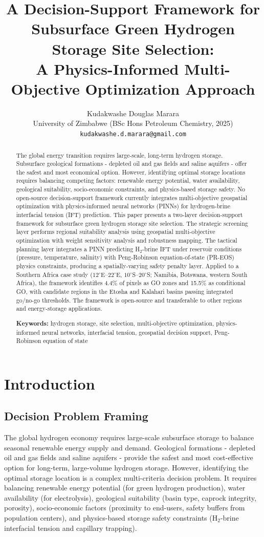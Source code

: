 \documentclass[11pt]{article}
\title{A Decision-Support Framework for Subsurface Green Hydrogen Storage Site Selection:\\A Physics-Informed Multi-Objective Optimization Approach}
\author{
    Kudakwashe Douglas Marara\\
    University of Zimbabwe (BSc Hons Petroleum Chemistry, 2025)\\
    \texttt{kudakwashe.d.marara@gmail.com}
}
\date{}
\begin{document}
\maketitle

\begin{abstract}
The global energy transition requires large-scale, long-term hydrogen storage. Subsurface geological formations - depleted oil and gas fields and saline aquifers - offer the safest and most economical option. However, identifying optimal storage locations requires balancing competing factors: renewable energy potential, water availability, geological suitability, socio-economic constraints, and physics-based storage safety. No open-source decision-support framework currently integrates multi-objective geospatial optimization with physics-informed neural networks (PINNs) for hydrogen-brine interfacial tension (IFT) prediction. This paper presents a two-layer decision-support framework for subsurface green hydrogen storage site selection. The strategic screening layer performs regional suitability analysis using geospatial multi-objective optimization with weight sensitivity analysis and robustness mapping. The tactical planning layer integrates a PINN predicting H$_2$-brine IFT under reservoir conditions (pressure, temperature, salinity) with Peng-Robinson equation-of-state (PR-EOS) physics constraints, producing a spatially-varying safety penalty layer. Applied to a Southern Africa case study ($12^\circ$E--$22^\circ$E, $10^\circ$S--$20^\circ$S; Namibia, Botswana, western South Africa), the framework identifies 4.4\% of pixels as GO zones and 15.5\% as conditional GO, with candidate regions in the Etosha and Kalahari basins passing integrated go/no-go thresholds. The framework is open-source and transferable to other regions and energy-storage applications.

\textbf{Keywords:} hydrogen storage, site selection, multi-objective optimization, physics-informed neural networks, interfacial tension, geospatial decision support, Peng-Robinson equation of state
\end{abstract}

\section{Introduction}
\subsection{Decision Problem Framing}
The global hydrogen economy requires large-scale subsurface storage to balance seasonal renewable energy supply and demand. Geological formations - depleted oil and gas fields and saline aquifers - provide the safest and most cost-effective option for long-term, large-volume hydrogen storage. However, identifying the optimal storage location is a complex multi-criteria decision problem. It requires balancing renewable energy potential (for green hydrogen production), water availability (for electrolysis), geological suitability (basin type, caprock integrity, porosity), socio-economic factors (proximity to end-users, safety buffers from population centers), and physics-based storage safety constraints (H$_2$-brine interfacial tension and capillary trapping).
\end{document}
